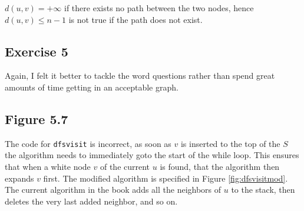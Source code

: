 \documentclass{article}
\begin{document}
\(d(u,v) = + \infty \) if there exists no path between the two nodes, hence \(d(u,v) \leq n-1\) is not true if the path does not exist.

\subsection*{Exercise 5}

Again, I felt it better to tackle the word questions rather than spend great amounts of time getting in an acceptable graph.

\subsection*{Figure 5.7}

The code for \texttt{dfsvisit} is incorrect, as soon as \(v\) is inserted to the top of the \(S\) the algorithm needs to immediately goto the start of the while loop. This ensures that when a white node \(v\) of the current \(u\) is found, that the algorithm then expands \(v\) first. The modified algorithm is specified in Figure \ref{fig:dfsvisitmod}. The current algorithm in the book adds all the neighbors of \(u\) to the stack, then deletes the very last added neighbor, and so on.
\end{document}
